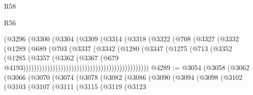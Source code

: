 \begin{lexlean}{R58}
\begin{lexlean}{R56}
\begin{coremodule}
{{{{{{{{{{{{{{{{{{{{{{{{{{{{{{{{{{{{{{{{{{{{{{{{{{{{{{{{{{{{{{{{{{{{{{{{{{{{{{{{{{{{{{{{{{{{{{{{{{{{{{{{{{{{{{{{{{{{{{{{{{{{{{{{{{{{{{{{{{{{{{{{{{{{{{{{{{{{{{{{{{{{{{{{{{{{{{{{{{{{{{{{{{{{{{{{{{{{{{{{{{{{{{{{{{{                                                (@3296
                                                  (@3300
                                                    (@3304
                                                      (@3309
                                                        (@3314
                                                          (@3318
                                                            (@3322
                                                              (@708
                                                                (@3327
                                                                  (@3332
                                                                    (@1289
                                                                      (@689
                                                                        (@703
                                                                          (@3337
                                                                            (@3342
                                                                              (@1280
                                                                                (@3347
                                                                                  (@1275
                                                                                    (@713
                                                                                      (@3352
                                                                                        (@1285
                                                                                          (@3357
                                                                                            (@3362
                                                                                              (@3367
                                                                                                (@679
                                                                                                  @4193)))))))))))))))))))))))))))))))))))))))))))))))
@4289 := @3054
    (@3058
      (@3062
        (@3066
          (@3070
            (@3074
              (@3078
                (@3082
                  (@3086
                    (@3090
                      (@3094
                        (@3098
                          (@3102
                            (@3103
                              (@3107
                                (@3111
                                  (@3115
                                    (@3119
                                      (@3123
}}}}}}}}}}}}}}}}}}}}}}}}}}}}}}}}}}}}}}}}}}}}}}}}}}}}}}}}}}}}}}}}}}}}}}}}}}}}}}}}}}}}}}}}}}}}}}}}}}}}}}}}}}}}}}}}}}}}}}}}}}}}}}}}}}}}}}}}}}}}}}}}}}}}}}}}}}}}}}}}}}}}}}}}}}}}}}}}}}}}}}}}}}}}}}}}}}}}}}}}}}}}}}}}}}}
\end{coremodule}
\end{lexlean}
\end{lexlean}
